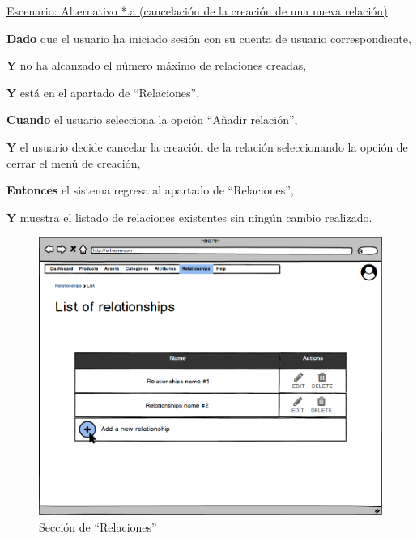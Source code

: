 \underline{Escenario: Alternativo *.a (cancelación de la creación de una nueva relación)}\par
\vspace{0.15cm}
\textbf{Dado} que el usuario ha iniciado sesión con su cuenta de usuario correspondiente,\par
\textbf{Y} no ha alcanzado el número máximo de relaciones creadas,\par
\textbf{Y} está en el apartado de \enquote{Relaciones},\par
\textbf{Cuando} el usuario selecciona la opción \enquote{Añadir relación},\par
\textbf{Y} el usuario decide cancelar la creación de la relación seleccionando la opción de cerrar el menú de creación,\par
\textbf{Entonces} el sistema regresa al apartado de \enquote{Relaciones},\par
\textbf{Y} muestra el listado de relaciones existentes sin ningún cambio realizado.\par

\vspace{0.20cm}

\begin{figure}[H]
    \includegraphics[width=1\linewidth]{assets/mockups/RF5.1_1.png}
    \caption{Sección de \enquote{Relaciones}}
   \end{figure}
\vspace{1.0cm}


